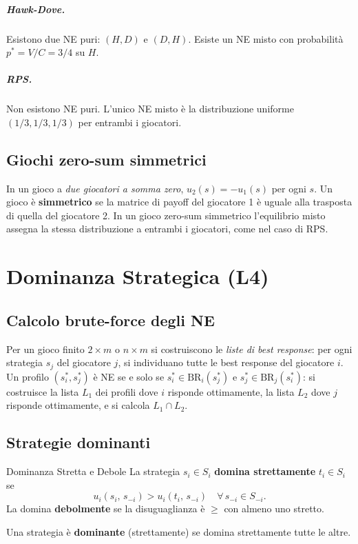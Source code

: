\documentclass[12pt,a4paper,twoside]{book}
\theoremstyle{plain}
\theoremstyle{definition}
\newcommand{\BR}{\mathrm{BR}}
\begin{document}
\paragraph{Hawk-Dove.} Esistono due NE puri: $(H,D)$ e $(D,H)$. Esiste un NE misto con probabilità $p^*=V/C=3/4$ su $H$.

\paragraph{RPS.} Non esistono NE puri. L'unico NE misto è la distribuzione uniforme $(1/3,1/3,1/3)$ per entrambi i giocatori.

\section{Giochi zero-sum simmetrici}

In un gioco a \emph{due giocatori a somma zero}, $u_2(s) = -u_1(s)$ per ogni $s$. Un gioco è \textbf{simmetrico} se la matrice di payoff del giocatore 1 è uguale alla trasposta di quella del giocatore 2. In un gioco zero-sum simmetrico l'equilibrio misto assegna la stessa distribuzione a entrambi i giocatori, come nel caso di RPS.

\chapter{Dominanza Strategica (L4)}

\section{Calcolo brute-force degli NE}

Per un gioco finito $2\times m$ o $n\times m$ si costruiscono le \emph{liste di best response}: per ogni strategia $s_j$ del giocatore $j$, si individuano tutte le best response del giocatore $i$. Un profilo $(s_i^*,s_j^*)$ è NE se e solo se $s_i^*\in\BR_i(s_j^*)$ e $s_j^*\in\BR_j(s_i^*)$: si costruisce la lista $L_1$ dei profili dove $i$ risponde ottimamente, la lista $L_2$ dove $j$ risponde ottimamente, e si calcola $L_1\cap L_2$.

\section{Strategie dominanti}

\begin{defbox}{Dominanza Stretta e Debole}
La strategia $s_i\in S_i$ \textbf{domina strettamente} $t_i\in S_i$ se
\[
  u_i(s_i,\, s_{-i}) > u_i(t_i,\, s_{-i})\quad \forall\,s_{-i}\in S_{-i}.
\]
La domina \textbf{debolmente} se la disuguaglianza è $\ge$ con almeno uno stretto.

Una strategia è \textbf{dominante} (strettamente) se domina strettamente tutte le altre.
\end{defbox}
\end{document}

